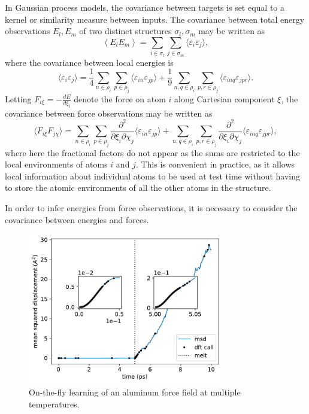 \documentclass[%
reprint,
superscriptaddress,
amsmath,amssymb,
aps,
prl,
]{revtex4-1}
\begin{document}
In Gaussian process models, the covariance between targets is set equal to a kernel or similarity measure between inputs. The covariance between total energy observations $E_l, E_m$ of two distinct structures $\sigma_l, \sigma_m$ may be written as
\begin{equation}
\left\langle E_l E_m \right\rangle = \sum_{i \in \sigma_l} \sum_{j \in \sigma_m} \langle \varepsilon_i \varepsilon_j \rangle,
\end{equation}
where the covariance between local energies is
\begin{equation}
\langle \varepsilon_i \varepsilon_j \rangle = \frac{1}{4} \sum_{n \in \rho_i} \sum_{p \in \rho_j} \langle \varepsilon_{i n} \varepsilon_{j p} \rangle + \frac{1}{9} \sum_{n, q \in \rho_i} \sum_{p, r \in \rho_j} \langle \varepsilon_{inq} \varepsilon_{jpr} \rangle.
\end{equation}
Letting $F_{i\xi} = - \frac{d E}{d \xi_i}$ denote the force on atom $i$ along Cartesian component $\xi$, the covariance between force observations may be written as
\begin{equation}
  \langle F_{i\xi} F_{j \chi} \rangle =  \sum_{n \in \rho_i} \sum_{p \in \rho_j} \frac{\partial^2}{\partial \xi_i \partial \chi_j} \langle \varepsilon_{i n} \varepsilon_{j p} \rangle +  \sum_{n, q \in \rho_i} \sum_{p, r \in \rho_j} \frac{\partial^2}{\partial \xi_i \partial \chi_j} \langle \varepsilon_{inq} \varepsilon_{jpr} \rangle,
\end{equation}
where here the fractional factors do not appear as the sums are restricted to the local environments of atoms $i$ and $j$. This is convenient in practice, as it allows local information about individual atoms to be used at test time without having to store the atomic environments of all the other atoms in the structure.

In order to infer energies from force observations, it is necessary to consider the covariance between energies and forces.

\newpage

\begin{figure}
	\centering
	\includegraphics[width=3.4in]{melt_msd_3.pdf}
	\caption{On-the-fly learning of an aluminum force field at multiple temperatures.}
\end{figure}
\end{document}
